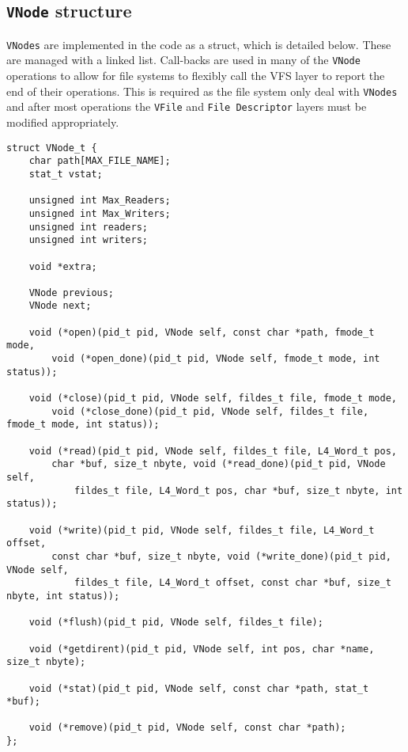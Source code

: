 \documentclass[12pt,english]{article}
\begin{document}
\subsection{\texttt{VNode} structure} \label{vfs:vnode_struct}

\texttt{VNodes} are implemented in the code as a struct, which is detailed below. These are managed with a linked list. Call-backs are used in many of the \texttt{VNode} operations to allow for file systems to flexibly call the VFS layer to report the end of their operations. This is required as the file system only deal with \texttt{VNodes} and after most operations the \texttt{VFile} and \texttt{File Descriptor} layers must be modified appropriately.

\begin{verbatim}
struct VNode_t {
    char path[MAX_FILE_NAME];
    stat_t vstat;
    
    unsigned int Max_Readers;
    unsigned int Max_Writers;
    unsigned int readers;
    unsigned int writers;
    
    void *extra; 
    
    VNode previous;
    VNode next;
    
    void (*open)(pid_t pid, VNode self, const char *path, fmode_t mode,
        void (*open_done)(pid_t pid, VNode self, fmode_t mode, int status));
    
    void (*close)(pid_t pid, VNode self, fildes_t file, fmode_t mode,
        void (*close_done)(pid_t pid, VNode self, fildes_t file, fmode_t mode, int status));
    
    void (*read)(pid_t pid, VNode self, fildes_t file, L4_Word_t pos,
        char *buf, size_t nbyte, void (*read_done)(pid_t pid, VNode self,
            fildes_t file, L4_Word_t pos, char *buf, size_t nbyte, int status));
    
    void (*write)(pid_t pid, VNode self, fildes_t file, L4_Word_t offset,
        const char *buf, size_t nbyte, void (*write_done)(pid_t pid, VNode self,
            fildes_t file, L4_Word_t offset, const char *buf, size_t nbyte, int status));
    
    void (*flush)(pid_t pid, VNode self, fildes_t file);
    
    void (*getdirent)(pid_t pid, VNode self, int pos, char *name, size_t nbyte);
    
    void (*stat)(pid_t pid, VNode self, const char *path, stat_t *buf);
    
    void (*remove)(pid_t pid, VNode self, const char *path);
};
\end{verbatim}
\end{document}
